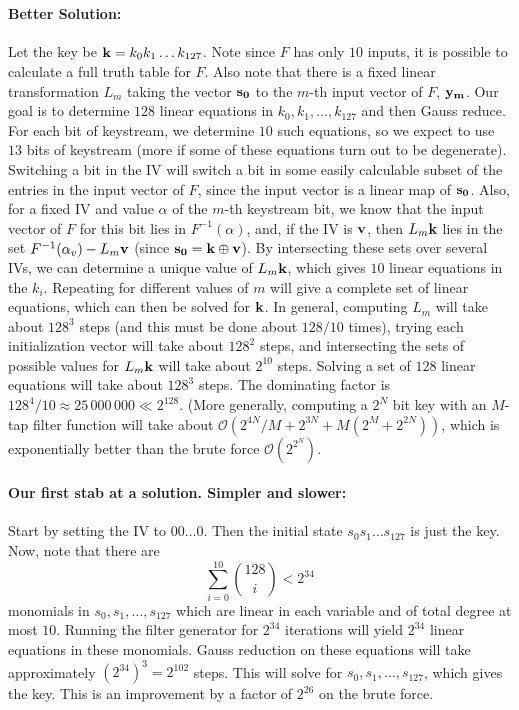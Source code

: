 \ 
\paragraph{Better Solution: }
Let the key be ${\bf k}= k_0k_1\dots k_{127}$.
Note since $F$ has only $10$ inputs, it is possible to calculate a full truth
table for $F$. Also note that there is a fixed linear transformation $L_m$ taking
the vector ${\bf s_0}$ to the $m$-th input vector of $F$, ${\bf y_m}$. Our goal is to determine
$128$ linear equations in $k_0,k_1,\dots,k_{127}$ and then Gauss reduce. For each
bit of keystream, we determine $10$ such equations, so we expect to use $13$ bits
of keystream (more if some of these equations turn out to be degenerate). 
Switching a bit in the IV will switch a bit in some easily calculable
subset of the entries in the input vector of $F$, since the input vector is a
linear map of ${\bf s_0}$. Also, for a fixed IV and value $\alpha$
of the $m$-th keystream bit, we know that the input vector of $F$ for this bit
lies in $F^{-1}(\alpha)$, and, if the IV is ${\bf v}$, then $L_m{\bf k}$ lies in
the set $F^{-1}(\alpha_v)-L_m{\bf v}$ (since ${\bf s_0} ={\bf k} \oplus {\bf v}$).
By intersecting these sets over several IVs, we can determine a unique value of
$L_m{\bf k}$, which gives $10$ linear equations in the $k_i$. Repeating for different
values of $m$ will give a complete set of linear equations, which can then be solved
for ${\bf k}$. In general, computing $L_m$ will take about $128^3$ steps (and this
must be done about $128/10$ times), trying each
initialization vector will take about $128^2$ steps, and intersecting the sets of
possible values for $L_m{\bf k}$ will take about $2^{10}$ steps. Solving a set of
$128$ linear equations will take about $128^3$ steps. The dominating factor is 
$128^4/10 \approx 25\,000\,000 \ll 2^{128}$.
(More generally, computing a $2^N$ bit key with an $M$-tap filter
function will take about $\mathcal{O}(2^{4N}/M+2^{3N}+M(2^M+2^{2N}))$, which
is exponentially better than the brute force $\mathcal{O}(2^{2^N})$.

\paragraph{Our first stab at a solution. Simpler and slower:}
Start by setting the IV to $00\dots 0$. Then the initial state $s_0s_1\dots s_{127}$
is just the key. Now, note that there are 
\[ \sum_{i=0}^{10} {\binom{128}{i}} <2^{34}\] monomials in $s_0,s_1, \dots, s_{127}$
which are linear in each variable and of total degree at most $10$. Running
the filter generator for $2^{34}$ iterations will yield $2^{34}$ linear equations
in these monomials. Gauss reduction on these equations will take approximately
$(2^{34})^3 = 2^{102}$ steps. This will solve for $s_0,s_1,\dots, s_{127}$, which
gives the key. This is an improvement by a factor of $2^{26}$ on the brute force.
